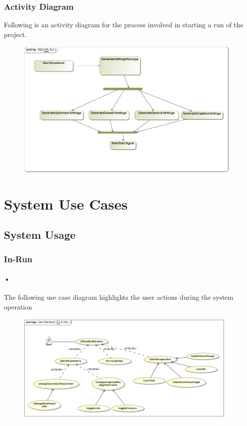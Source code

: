 \documentclass[11pt]{article}
\begin{document}
\subsubsection{Activity Diagram}
Following is an activity diagram for the process involved in starting a run of the project.
\begin{figure}[H]
	\includegraphics[scale=0.45]{GUI_Activity.jpg}
\end{figure}

\section{System Use Cases}
\subsection{System Usage}
\subsubsection{In-Run}
\paragraph{•}
The following use case diagram highlights the user actions during the system operation
\begin{figure}[H]
	\includegraphics[scale=0.55]{inUse.png}
\end{figure}
\end{document}
